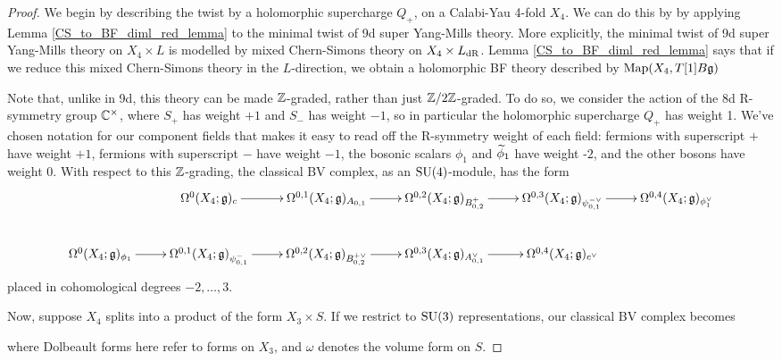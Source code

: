\documentclass[10pt, oneside]{article}
\begin{document}
\begin{proof}
We begin by describing the twist by a holomorphic supercharge $Q_+$, on a Calabi-Yau 4-fold $X_4$.  We can do this by by applying Lemma \ref{CS_to_BF_diml_red_lemma} to the minimal twist of 9d super Yang-Mills theory.  More explicitly, the minimal twist of 9d super Yang-Mills theory on $X_4 \times L$ is modelled by mixed Chern-Simons theory on $X_4 \times L_{\mathrm{dR}}$. Lemma \ref{CS_to_BF_diml_red_lemma} says that if we reduce this mixed Chern-Simons theory in the $L$-direction, we obtain a holomorphic BF theory described by $\operatorname{Map}(X_4, T[1]B\mathfrak{g})$

Note that, unlike in 9d, this theory can be made $\mathbb Z$-graded, rather than just $\mathbb Z/2\mathbb Z$-graded.  To do so, we consider the action of the 8d R-symmetry group $\mathbb C^\times$, where $S_+$ has weight $+1$ and $S_-$ has weight $-1$, so in particular the holomorphic supercharge $Q_+$ has weight 1.  We've chosen notation for our component fields that makes it easy to read off the R-symmetry weight of each field: fermions with superscript $+$ have weight $+1$, fermions with superscript $-$ have weight $-1$, the bosonic scalars $\phi_1$ and $\widetilde{\phi}_1$ have weight -$2$, and the other bosons have weight 0.  With respect to this $\mathbb Z$-grading, the classical BV complex, as an $\mathrm{SU}(4)$-module, has the form
\[\xymatrix{&\Omega^0(X_4; \gg)_c \ar[r] &\Omega^{0,1}(X_4; \gg)_{A_{0,1}} \ar[r] &\Omega^{0,2}(X_4; \gg)_{B^+_{0,2}} \ar[r] &\Omega^{0,3}(X_4; \gg)_{\psi_{0,1}^{-\vee}} \ar[r] &\Omega^{0,4}(X_4; \gg)_{\phi_1^\vee} \\
\Omega^0(X_4; \gg)_{\phi_1} \ar[r] &\Omega^{0,1}(X_4; \gg)_{\psi_{0,1}^{-}} \ar[r] &\Omega^{0,2}(X_4; \gg)_{B^{+\vee}_{0,2}} \ar[r] &\Omega^{0,3}(X_4; \gg)_{A_{0,1}^\vee} \ar[r] &\Omega^{0,4}(X_4; \gg)_{c^\vee}&
}\]
placed in cohomological degrees $-2, \ldots, 3$.

Now, suppose $X_4$ splits into a product of the form $X_3 \times S$.  If we restrict to $\mathrm{SU}(3)$ representations, our classical BV complex becomes

where Dolbeault forms here refer to forms on $X_3$, and $\omega$ denotes the volume form on $S$.


\end{proof}
\end{document}
